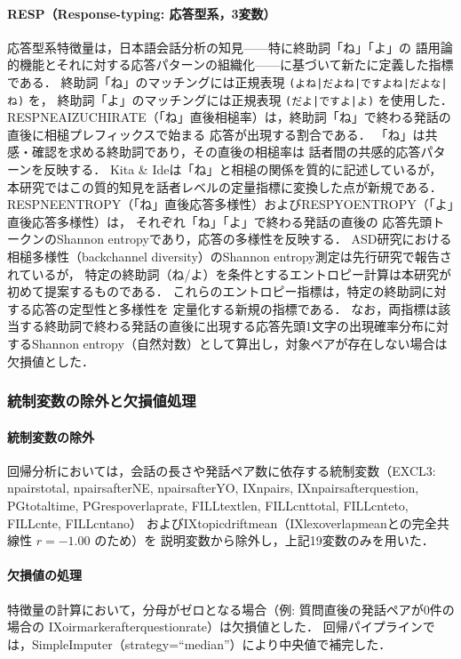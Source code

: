 \documentclass[dvipdfmx,11pt,a4paper]{bxjsarticle}
\renewcommand{\_}{\paperorigunderscore\allowbreak}%
\begin{document}
\paragraph{RESP（Response-typing: 応答型系，3変数）}
応答型系特徴量は，日本語会話分析の知見——特に終助詞「ね」「よ」の
語用論的機能とそれに対する応答パターンの組織化——に基づいて新たに定義した指標である．
終助詞「ね」のマッチングには正規表現 \texttt{(よね|だよね|ですよね|だよな|ね)} を，
終助詞「よ」のマッチングには正規表現 \texttt{(だよ|ですよ|よ)} を使用した．
RESP\_NE\_AIZUCHI\_RATE（「ね」直後相槌率）は，終助詞「ね」で終わる発話の直後に相槌プレフィックスで始まる
応答が出現する割合である．
「ね」は共感・確認を求める終助詞であり，その直後の相槌率は
話者間の共感的応答パターンを反映する．
Kita \& Ide\cite{kita2007}は「ね」と相槌の関係を質的に記述しているが，
本研究ではこの質的知見を話者レベルの定量指標に変換した点が新規である．
RESP\_NE\_ENTROPY（「ね」直後応答多様性）およびRESP\_YO\_ENTROPY（「よ」直後応答多様性）は，
それぞれ「ね」「よ」で終わる発話の直後の
応答先頭トークンのShannon entropyであり，応答の多様性を反映する．
ASD研究における相槌多様性（backchannel diversity）のShannon entropy測定は先行研究で報告されているが\cite{wehrle2024}，
特定の終助詞（ね/よ）を条件とするエントロピー計算は本研究が初めて提案するものである．
これらのエントロピー指標は，特定の終助詞に対する応答の定型性と多様性を
定量化する新規の指標である．
なお，両指標は該当する終助詞で終わる発話の直後に出現する応答先頭1文字の出現確率分布に対するShannon entropy（自然対数）として算出し，対象ペアが存在しない場合は欠損値とした．

\subsubsection{統制変数の除外と欠損値処理}

\paragraph{統制変数の除外}
回帰分析においては，会話の長さや発話ペア数に依存する統制変数（EXCL3: n\_pairs\_total,
n\_pairs\_after\_NE, n\_pairs\_after\_YO, IX\_n\_pairs, IX\_n\_pairs\_after\_question,
PG\_total\_time, PG\_resp\_overlap\_rate,
FILL\_text\_len, FILL\_cnt\_total, FILL\_cnt\_eto, FILL\_cnt\_e, FILL\_cnt\_ano）
およびIX\_topic\_drift\_mean（IX\_lex\_overlap\_meanとの完全共線性 $r = -1.00$ のため）を
説明変数から除外し，上記19変数のみを用いた．

\paragraph{欠損値の処理}
特徴量の計算において，分母がゼロとなる場合（例: 質問直後の発話ペアが0件の場合の
IX\_oirmarker\_after\_question\_rate）は欠損値とした．
回帰パイプラインでは，SimpleImputer（strategy=``median''）により中央値で補完した．
\end{document}
